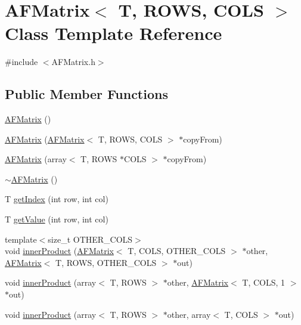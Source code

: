 \hypertarget{class_a_f_matrix}{}\section{A\+F\+Matrix$<$ T, R\+O\+WS, C\+O\+LS $>$ Class Template Reference}
\label{class_a_f_matrix}


{\ttfamily \#include $<$A\+F\+Matrix.\+h$>$}

\subsection*{Public Member Functions}
\begin{DoxyCompactItemize}
\item 
\hyperlink{class_a_f_matrix_a6ccd1bdad16dfa7ef38db5e0fc4e0e2b}{A\+F\+Matrix} ()
\item 
\hyperlink{class_a_f_matrix_ae76418eb02f3f9b84ee13aebaeca564a}{A\+F\+Matrix} (\hyperlink{class_a_f_matrix}{A\+F\+Matrix}$<$ T, R\+O\+WS, C\+O\+LS $>$ $\ast$copy\+From)
\item 
\hyperlink{class_a_f_matrix_adf63ea3dbdc05d678371099310993471}{A\+F\+Matrix} (array$<$ T, R\+O\+WS $\ast$C\+O\+LS $>$ $\ast$copy\+From)
\item 
\hyperlink{class_a_f_matrix_a657752979ec2d7bad591e3def1f4bcc7}{$\sim$\+A\+F\+Matrix} ()
\item 
T \hyperlink{class_a_f_matrix_a1363727b7a4b97bad5e7c9d9552d9cf5}{get\+Index} (int row, int col)
\item 
T \hyperlink{class_a_f_matrix_a0e36b5c6f333ac3d6508d5b00c92852c}{get\+Value} (int row, int col)
\item 
{\footnotesize template$<$size\+\_\+t O\+T\+H\+E\+R\+\_\+\+C\+O\+LS$>$ }\\void \hyperlink{class_a_f_matrix_a2c3183f964593d1bc52f6dc09429dbcc}{inner\+Product} (\hyperlink{class_a_f_matrix}{A\+F\+Matrix}$<$ T, C\+O\+LS, O\+T\+H\+E\+R\+\_\+\+C\+O\+LS $>$ $\ast$other, \hyperlink{class_a_f_matrix}{A\+F\+Matrix}$<$ T, R\+O\+WS, O\+T\+H\+E\+R\+\_\+\+C\+O\+LS $>$ $\ast$out)
\item 
void \hyperlink{class_a_f_matrix_a9f0e4b22b84400a30d275be6bd67d128}{inner\+Product} (array$<$ T, R\+O\+WS $>$ $\ast$other, \hyperlink{class_a_f_matrix}{A\+F\+Matrix}$<$ T, C\+O\+LS, 1 $>$ $\ast$out)
\item 
void \hyperlink{class_a_f_matrix_ad2763218bc42414ca32cdecba3b88be2}{inner\+Product} (array$<$ T, R\+O\+WS $>$ $\ast$other, array$<$ T, C\+O\+LS $>$ $\ast$out)

\end{DoxyCompactItemize}
